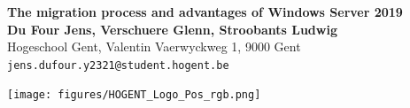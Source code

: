\documentclass[a0,portrait]{a0poster}
\begin{document}


\begin{minipage}[t]{0.75\linewidth}
\VeryHuge \color{HoGentAccent1} \textbf{The migration process and advantages of Windows Server 2019} \color{Black}\\ %
\huge \textbf{Du Four Jens, Verschuere Glenn, Stroobants Ludwig}\\[0.5cm] %
\huge Hogeschool Gent, Valentin Vaerwyckweg 1, 9000 Gent\\[0.4cm] %
\Large \texttt{jens.dufour.y2321@student.hogent.be} \\
\end{minipage}
%
\begin{minipage}[t]{0.25\linewidth}
\texttt{[image: figures/HOGENT\_Logo\_Pos\_rgb.png]} 

\end{minipage}

\vspace{1cm} %

\end{document}
